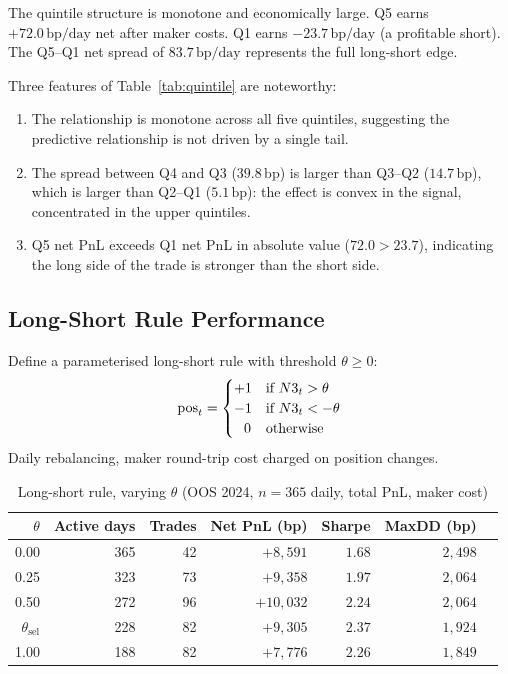 \documentclass[12pt, a4paper]{article}
\theoremstyle{plain}
\theoremstyle{definition}
\newcommand{\bp}{\,\mathrm{bp}}
\begin{document}
The quintile structure is monotone and economically large. Q5 earns
$+72.0\bp/\text{day}$ net after maker costs. Q1 earns $-23.7\bp/\text{day}$
(a profitable short). The Q5--Q1 net spread of $83.7\bp/\text{day}$ represents
the full long-short edge.

Three features of Table~\ref{tab:quintile} are noteworthy:
\begin{enumerate}[noitemsep]
  \item The relationship is monotone across all five quintiles, suggesting
        the predictive relationship is not driven by a single tail.
  \item The spread between Q4 and Q3 ($39.8\bp$) is larger than Q3--Q2
        ($14.7\bp$), which is larger than Q2--Q1 ($5.1\bp$): the effect
        is convex in the signal, concentrated in the upper quintiles.
  \item Q5 net PnL exceeds Q1 net PnL in absolute value ($72.0 > 23.7$),
        indicating the long side of the trade is stronger than the short side.
\end{enumerate}

\subsection{Long-Short Rule Performance}
\label{sec:longshort}

Define a parameterised long-short rule with threshold $\theta \geq 0$:
\[
  \text{pos}_t = \begin{cases}
    +1 & \text{if } N3_t > \theta \\
    -1 & \text{if } N3_t < -\theta \\
    \hspace{2.5mm}0 & \text{otherwise}
  \end{cases}
\]
Daily rebalancing, maker round-trip cost charged on position changes.

\begin{table}[H]
\centering
\caption{Long-short rule, varying $\theta$ (OOS 2024, $n=365$ daily, total PnL, maker cost)}
\label{tab:longshort}
\begin{tabular}{rrrrrrr}
\toprule
$\theta$ & Active days & Trades & Net PnL (bp) & Sharpe & MaxDD (bp) \\
\midrule
0.00 & 365 & 42  & $+8{,}591$  & $1.68$ & $2{,}498$ \\
0.25 & 323 & 73  & $+9{,}358$  & $1.97$ & $2{,}064$ \\
0.50 & 272 & 96  & $+10{,}032$ & $2.24$ & $2{,}064$ \\
$\theta_\mathrm{sel}$ & 228 & 82  & $+9{,}305$  & $\mathbf{2.37}$ & $1{,}924$ \\
1.00 & 188 & 82  & $+7{,}776$  & $2.26$ & $1{,}849$ \\
\bottomrule
\end{tabular}
\end{table}
\end{document}

